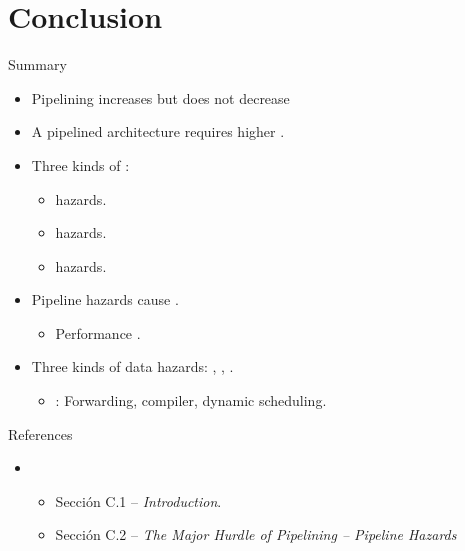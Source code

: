\section{Conclusion}

\begin{frame}[t]{Summary}
\begin{itemize}
  \item Pipelining increases  but does not decrease 

  \item A pipelined architecture requires higher .

  \item Three kinds of :
    \begin{itemize}
      \item {} hazards.
      \item {} hazards.
      \item {} hazards.
    \end{itemize}

  \item Pipeline hazards cause .
    \begin{itemize}
      \item Performance .
    \end{itemize}

  \item Three kinds of data hazards: , , .
    \begin{itemize}
      \item {}: Forwarding, compiler, dynamic scheduling.
    \end{itemize}

\end{itemize}
\end{frame}


\begin{frame}[t]{References}
\begin{itemize}
  \item \bibhennessy
    \begin{itemize}
      \item Sección C.1 -- \emph{Introduction}.
      \item Sección C.2 -- \emph{The Major Hurdle of Pipelining -- Pipeline Hazards}
    \end{itemize}
\end{itemize}
\end{frame}
